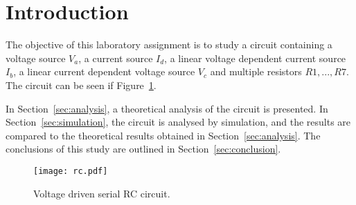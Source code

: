 \section{Introduction}
\label{sec:introduction}

The objective of this laboratory assignment is to study a circuit containing a voltage source $V_a$, a current source $I_d$, 
a linear voltage dependent current source $I_b$, a linear current dependent voltage source $V_c$ and multiple resistors $R1,...,R7$.
The circuit can be seen if Figure~\ref{fig:rc}.

\lipsum[1-1]

In Section~\ref{sec:analysis}, a theoretical analysis of the circuit is
presented. In Section~\ref{sec:simulation}, the circuit is analysed by
simulation, and the results are compared to the theoretical results obtained in
Section~\ref{sec:analysis}. The conclusions of this study are outlined in
Section~\ref{sec:conclusion}.

\begin{figure}[h] \centering
\texttt{[image: rc.pdf]}
\caption{Voltage driven serial RC circuit.}
\label{fig:rc}
\end{figure}

